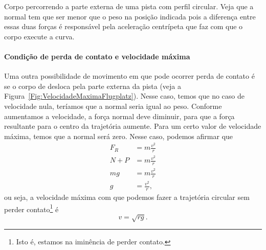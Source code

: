 \begin{marginfigure}
\centering
{}
\caption{Corpo percorrendo a parte externa de uma pista com perfil circular. Veja que a normal tem que ser menor que o peso na posição indicada pois a diferença entre essas duas forças é responsável pela aceleração centrípeta que faz com que o corpo execute a curva.\label{Fig:VelocidadeMaximaFlugplatz}}
\end{marginfigure}

\paragraph{Condição de perda de contato e velocidade máxima}

Uma outra possibilidade de movimento em que pode ocorrer perda de contato é se o corpo de desloca pela parte externa da pista (veja a Figura~\ref{Fig:VelocidadeMaximaFlugplatz}). Nesse caso, temos que no caso de velocidade nula, teríamos que a normal seria igual ao peso. Conforme aumentamos a velocidade, a força normal deve diminuir, para que a força resultante para o centro da trajetória aumente. Para um certo valor de velocidade máxima, temos que a normal será zero. Nesse caso, podemos afirmar que
\begin{align}
    F_R &= m \frac{v^2}{r} \\
    N + P &= m \frac{v^2}{r} \\
    mg &= m \frac{v^2}{r} \\
    g &= \frac{v^2}{r},
\end{align}
%
ou seja, a velocidade máxima com que podemos fazer a trajetória circular sem perder contato\footnote[][-2cm]{Isto é, estamos na iminência de perder contato.} é
\begin{equation}
    v = \sqrt{rg}.
\end{equation}

